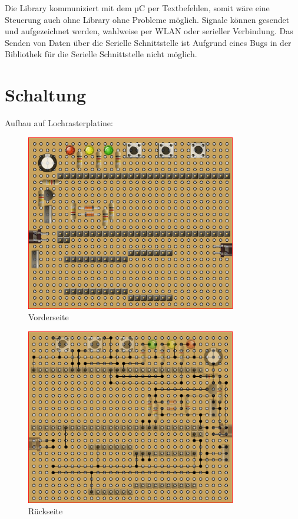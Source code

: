 \documentclass[11pt,a4paper,bibtotoc,oneside]{scrbook}
\begin{document}
Die Library kommuniziert mit dem µC per Textbefehlen, somit wäre eine Steuerung auch ohne Library ohne Probleme möglich.
Signale können gesendet und aufgezeichnet werden, wahlweise per WLAN oder serieller Verbindung. Das Senden von Daten über die 
Serielle Schnittstelle ist Aufgrund eines Bugs in der Bibliothek für die Serielle Schnittstelle nicht möglich.

\section{Schaltung}
Aufbau auf Lochrasterplatine:
  \begin{figure}[!ht]
    \centering
        \includegraphics[width=260pt]{./picture/front.png}
        \caption{\label{lm324}{Vorderseite}}
    \end{figure}
    
    \begin{figure}[!ht]
    \centering
        \includegraphics[width=260pt]{./picture/back.png}
        \caption{\label{lm324}{Rückseite}}
    \end{figure}
\end{document}

